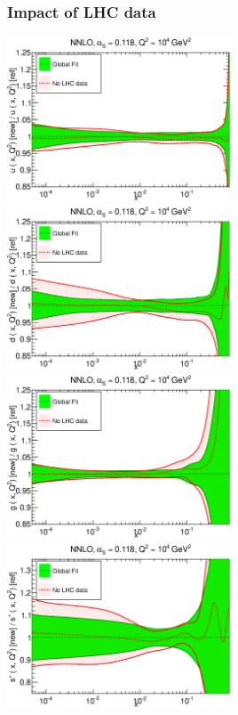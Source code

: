 \documentclass[10pt]{beamer}
\begin{document}
\begin{frame}
\frametitle{Impact of LHC data}

\includegraphics[width=0.50\textwidth]{figures/xu-30_vs_noLHC_highscale.eps}
\includegraphics[width=0.50\textwidth]{figures/xd-30_vs_noLHC_highscale.eps}\\
\includegraphics[width=0.50\textwidth]{figures/xg-30_vs_noLHC_highscale.eps}
\includegraphics[width=0.50\textwidth]{figures/xsp-30_vs_noLHC_highscale.eps}

\end{frame}
\end{document}
